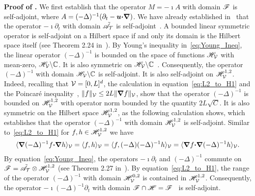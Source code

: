 \documentclass[amsa]{ipart}
\begin{document}
\textbf{Proof of .}\hspace{1ex}
%
We first establish that the operator $M=-\imath A$ with domain
$\mathscr{F}$ is
self-adjoint, where $A=(-\Delta)^{-1}(\partial_t-\boldsymbol{u}\mbox{\boldmath${\cdot}$}\mbox{\boldmath${\nabla}$})$. We have
already established 
in~ that the operator $-\imath\partial_t$ with domain
$\tilde{\mathscr{A}}_{\mathcal{T}}$ is self-adjoint~\cite{Stone:64}. A bounded
linear symmetric operator is self-adjoint on a Hilbert space if and
only its domain is the Hilbert space itself (see Theorem 2.24
in~\cite{Stone:64}). By Young's inequality in~\eqref{eq:Young_Ineq},
the linear operator $(-\Delta)^{-1}$ is bounded on the space of functions
$\mathscr{H}_{\mathcal{V}}$ with mean-zero, $\mathscr{H}_{\mathcal{V}}\backslash\mathbb{C}$. It is also symmetric on 
$\mathscr{H}_{\mathcal{V}}\backslash\mathbb{C}$~\cite{Stakgold:BVP:2000,Folland:95:PDEs}. Consequently, the operator $(-\Delta)^{-1}$ with domain $\mathscr{H}_{\mathcal{V}}\backslash\mathbb{C}$ is
self-adjoint. It is also self-adjoint on $\mathscr{H}^{1,2}_{\mathcal{V}}$. Indeed,
recalling that $\mathcal{V}=[0,L]^d$, the calculation in
equation~\eqref{eq:L2_to_H1} and the Poincar{\'e} 
inequality~\cite{McOwen:2003:PDE}, $\|f\|_{\mathcal{V}}\leq2L\|\mbox{\boldmath${\nabla}$} f\|_{\mathcal{V}}$, show that the
operator $(-\Delta)^{-1}$ is bounded on $\mathscr{H}^{1,2}_{\mathcal{V}}$ with operator norm
bounded by the quantity $2L\sqrt{C}$. It is also
symmetric on the Hilbert space $\mathscr{H}^{1,2}_{\mathcal{V}}$, as the following
calculation shows, which establishes that the operator $(-\Delta)^{-1}$
with domain $\mathscr{H}^{1,2}_{\mathcal{V}}$ is self-adjoint. Similar
to~\eqref{eq:L2_to_H1} for $f,h\in\mathscr{H}^{1,2}_{\mathcal{V}}$ we have
% 
\begin{align}
  \langle\bnabla(-\Delta)^{-1}f\bcdot\bnabla h\rangle_{\Vc}
               =\langle f,h\rangle_{\Vc}
               =\langle f,(-\Delta)(-\Delta)^{-1}h\rangle_{\Vc}
               =\langle\bnabla f\bcdot\bnabla(-\Delta)^{-1}h\rangle_{\Vc}.
\end{align}
%
By equation~\eqref{eq:Young_Ineq}, the operators $-\imath\partial_t$
and $(-\Delta)^{-1}$ commute on 
$\mathscr{F}=\tilde{\mathscr{A}}_{\mathcal{T}}\otimes\mathscr{H}^{1,2}_{\mathcal{V}}$ (see Theorem 2.27
in~\cite{Folland:99:RealAnalysis}). By equation~\eqref{eq:L2_to_H1},
the range of the operator $(-\Delta)^{-1}$ with domain $\mathscr{H}^{0,2}_{\mathcal{V}}$ is
contained in $\mathscr{H}^{1,2}_{\mathcal{V}}$.  Consequently, the operator 
$-\imath(-\Delta)^{-1}\partial_t$ with domain $\mathscr{F}\cap\mathscr{H}=\mathscr{F}$~\cite{Stone:64} is
self-adjoint.   
\end{document}
